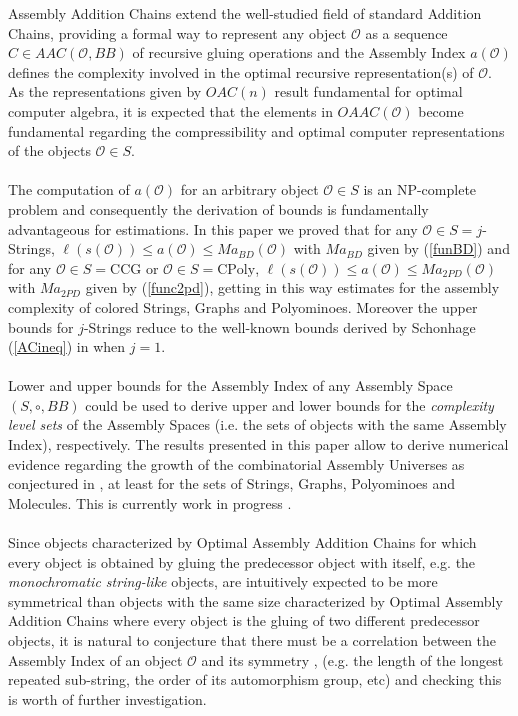 \documentclass[letterpaper,12pt]{article}
\theoremstyle{definition}
\begin{document}
Assembly Addition Chains extend the well-studied field of standard Addition Chains, providing a formal way to represent any object $\mathscr{O}$ as a sequence $C \in AAC(\mathscr{O},BB)$ of recursive gluing operations and the Assembly Index $a(\mathscr{O})$ defines the complexity involved in the optimal recursive representation(s) of $\mathscr{O}$. As the representations given by $OAC(n)$ result fundamental for optimal computer algebra, it is expected that the elements in $OAAC(\mathscr{O})$ become fundamental regarding the compressibility and optimal computer representations of the objects $\mathscr{O} \in S$.   \\\\
The computation of $a(\mathscr{O})$ for an arbitrary object $\mathscr{O} \in S$ is an NP-complete problem and consequently the derivation of bounds is fundamentally advantageous for estimations. In this paper we proved that for any $\mathscr{O} \in S=j$-Strings, $\ell(s(\mathscr{O})) \leq a(\mathscr{O}) \leq Ma_{BD}(\mathscr{O})$ with $Ma_{BD}$ given by (\ref{funBD}) and for any $\mathscr{O} \in S=\text{CCG}$ or $\mathscr{O} \in S=\text{CPoly}$, $\ell(s(\mathscr{O})) \leq a(\mathscr{O}) \leq Ma_{2PD}(\mathscr{O})$ with $Ma_{2PD}$ given by (\ref{func2pd}), getting in this way estimates for the assembly complexity of colored Strings, Graphs and Polyominoes. Moreover the upper bounds for $j$-Strings reduce to the well-known bounds derived by Schonhage (\ref{ACineq}) in \cite{SCHONHAGE19751} when $j=1$. \\\\
Lower and upper bounds for the Assembly Index of any Assembly Space $(S,\circ,BB)$ could be used to derive upper and lower bounds for the \textit{complexity level sets} of the Assembly Spaces (i.e. the sets of objects with the same Assembly Index), respectively. The results presented in this paper allow to derive numerical evidence regarding the growth of the combinatorial Assembly Universes as conjectured in \cite{Sharma2023AssemblyTE}, at least for the sets of Strings, Graphs, Polyominoes and Molecules. This is currently work in progress \cite{boundschemistry}. \\\\
Since objects characterized by Optimal Assembly Addition Chains for which every object is obtained by gluing the predecessor object with itself, e.g. the \textit{monochromatic string-like} objects, are intuitively expected to be more symmetrical than objects with the same size characterized by Optimal Assembly Addition Chains where every object is the gluing of two different predecessor objects, it is natural to conjecture that there must be a correlation between the Assembly Index of an object $\mathscr{O}$ and its symmetry \cite{johnston2022symmetry}, \cite{vimal2025open}  (e.g. the length of the longest repeated sub-string, the order of its automorphism group, etc) and checking this is worth of further investigation. 
\end{document}
